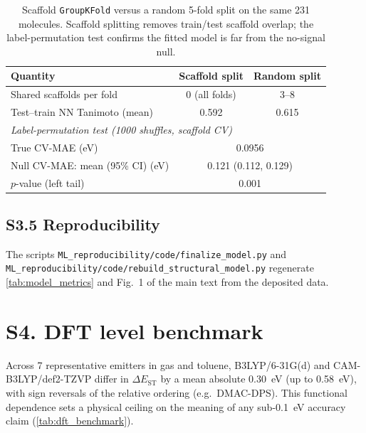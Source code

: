 \documentclass[twoside,twocolumn,9pt]{extarticle}
\begin{document}
\begin{table}[htbp]
  \centering
  \caption{Scaffold \texttt{GroupKFold} versus a random 5-fold split on the same
    \num{231} molecules. Scaffold splitting removes train/test scaffold overlap; the
    label-permutation test confirms the fitted model is far from the no-signal null.}
  \label{tab:scaffold}
  \footnotesize
  \begin{tabular}{lcc}
    \toprule
    Quantity & Scaffold split & Random split \\
    \midrule
    Shared scaffolds per fold        & 0 (all folds) & 3--8 \\
    Test--train NN Tanimoto (mean)   & 0.592 & 0.615 \\
    \midrule
    \multicolumn{3}{l}{\emph{Label-permutation test (1000 shuffles, scaffold CV)}} \\
    True CV-MAE (eV)                 & \multicolumn{2}{c}{0.0956} \\
    Null CV-MAE: mean (95\% CI) (eV) & \multicolumn{2}{c}{0.121 (0.112, 0.129)} \\
    $p$-value (left tail)            & \multicolumn{2}{c}{0.001} \\
    \bottomrule
  \end{tabular}
\end{table}

\subsection*{S3.5 Reproducibility}
The scripts \texttt{ML\_reproducibility/code/finalize\_model.py} and
\texttt{ML\_reproducibility/code/rebuild\_structural\_model.py} regenerate \cref{tab:model_metrics}
and Fig.~1 of the main text from the deposited data.

\section*{S4. DFT level benchmark}
Across \num{7} representative emitters in gas and toluene, B3LYP/6-31G(d) and
CAM-B3LYP/def2-TZVP differ in $\Delta E_\text{ST}$ by a mean absolute
\qty{0.30}{\electronvolt} (up to \qty{0.58}{\electronvolt}), with sign reversals
of the relative ordering (e.g.\ DMAC-DPS). This functional dependence sets a
physical ceiling on the meaning of any sub-\qty{0.1}{\electronvolt} accuracy
claim (\cref{tab:dft_benchmark}).
\end{document}
